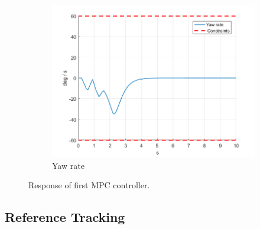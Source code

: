 \documentclass[11pt]{article}
\begin{document}
\begin{enumerate}
\begin{figure}[ht]
\begin{subfigure}[c]{0.3\linewidth}
            \includegraphics[width=\linewidth]{Plots_03_FirstMPCController/06}
            \caption{Yaw rate}
        \end{subfigure}
        \caption{Response of first MPC controller.}
        \label{fig:1st_mpc_controller}
\end{figure}
\end{enumerate}



\newpage
\subsection*{Reference Tracking} %
\label{sub:reference_tracking}
\end{document}
